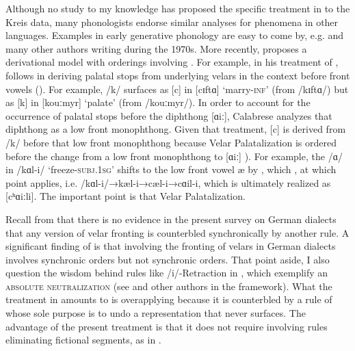 Although no study to my knowledge has proposed the specific treatment in  to the Kreis  data, many phonologists endorse similar analyses for phenomena in other languages. Examples in early generative phonology are easy to come by, e.g. \citet{ChomskyHalle1968} and many other authors writing during the 1970s. More recently, \citet{Calabrese2005} proposes a derivational model with  orderings involving . For example, in his treatment of , \citet[38--41]{Calabrese2005} follows \citet{Anderson1981} in deriving palatal stops from underlying velars in the context before front vowels (). For example, /k/ surfaces as [c] in [cɪftɑ] ‘marry\textsc{{}-inf}’ (from /kɪftɑ/) but as [k] in [kouːmyr] ‘palate’ (from /kouːmyr/). In order to account for the occurrence of palatal stops before the diphthong [ɑiː], Calabrese analyzes that diphthong as a low front monophthong. Given that treatment, [c] is derived from /k/ before that low front monophthong because Velar Palatalization is ordered before the change from a low front monophthong to [ɑiː] ). For example, the /ɑ/ in /kɑl-i/ ‘freeze-\textsc{subj}.\textsc{1}\textsc{sg}’ shifts to the low front vowel {\textbar}æ{\textbar} by , which  , at which point  applies, i.e. /kɑl-i/→{\textbar}kæl-i{\textbar}→{\textbar}cæl-i{\textbar}→{\textbar}cɑil-i{\textbar}, which is ultimately realized as [cʰɑiːli]. The important point is that   Velar Palatalization.

Recall from  that there is no evidence in the present survey on German dialects that any version of velar fronting is counterbled synchronically by another rule. A significant finding of  is that  involving the fronting of velars in German dialects involves synchronic  orders but not synchronic  orders. That point aside, I also question the wisdom behind rules like /i/-Retraction in , which exemplify an \textsc{absolute} \textsc{neutralization} (see \citealt{KaisseShaw1985} and other authors in the  framework). What the treatment in  amounts to is  overapplying because it is counterbled by a rule of  whose sole purpose is to undo a representation that never surfaces. The advantage of the present treatment is that it does not require   involving rules eliminating fictional segments, as in .


